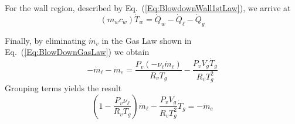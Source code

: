 For the wall region, described by Eq.~(\ref{Eq:BlowdownWall1stLaw}),
we arrive at
\begin{equation}
     (m_w c_w) \dot{T}_w = \dot{Q}_w - \dot{Q}_\ell - \dot{Q}_g \label{Eq:BlowdownWVaporEq3}
\end{equation}

Finally, by eliminating $\dot{m}_v$ in the Gas Law shown in
Eq.~(\ref{Eq:BlowDownGasLaw}) we obtain
%
\begin{equation}
    -\dot{m}_\ell - \dot{m}_e =   \frac{P_v (-\nu_\ell \dot{m}_\ell)}{R_v T_g} - \frac{P_v V_g \dot{T}_g}{R_v T_g^2}
\end{equation}
%
Grouping terms yields the result
\begin{equation}
    \left(  1 - \frac{P_v\nu_\ell }{R_v T_g}  \right) \dot{m}_\ell - \frac{P_v V_g }{R_v T_g^2}\dot{T}_g  =  - \dot{m}_e \label{Eq:BlowdownWVaporEq4}
\end{equation}

